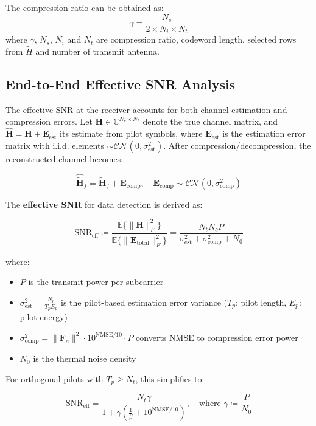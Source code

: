 \documentclass[lettersize,journal]{IEEEtran}
\begin{document}
The compression ratio can be obtained as:
\[
\gamma = \frac{N_{s}}{2\times N_{i}\times N_{t}}  
\]
where $\gamma$, $N_{s}$, $N_{i}$ and $N_{t}$ are compression ratio, codeword length, selected rows from $\tilde{H}$ and number of transmit antenna.

\subsection{End-to-End Effective SNR Analysis}
The effective SNR at the receiver accounts for both channel estimation and compression errors. Let $\mathbf{H} \in \mathbb{C}^{N_c \times N_t}$ denote the true channel matrix, and $\hat{\mathbf{H}} = \mathbf{H} + \mathbf{E}_{\text{est}}$ its estimate from pilot symbols, where $\mathbf{E}_{\text{est}}$ is the estimation error matrix with i.i.d. elements $\sim \mathcal{CN}(0,\sigma_{\text{est}}^2)$. After compression/decompression, the reconstructed channel becomes:

\begin{equation}
\hat{\tilde{\mathbf{H}}}_f = \tilde{\mathbf{H}}_f + \mathbf{E}_{\text{comp}}, \quad \mathbf{E}_{\text{comp}} \sim \mathcal{CN}(0,\sigma_{\text{comp}}^2)
\end{equation}

The \textbf{effective SNR} for data detection is derived as:

\begin{equation}
\text{SNR}_{\text{eff}} \coloneqq \frac{\mathbb{E}\{\|\mathbf{H}\|_F^2\}}{\mathbb{E}\{\|\mathbf{E}_{\text{total}}\|_F^2\}} = \frac{N_t N_c P}{\sigma_{\text{est}}^2 + \sigma_{\text{comp}}^2 + N_0}
\end{equation}

\noindent where:
\begin{itemize}
\item $P$ is the transmit power per subcarrier
\item $\sigma_{\text{est}}^2 = \frac{N_0}{T_p E_p}$ is the pilot-based estimation error variance ($T_p$: pilot length, $E_p$: pilot energy)
\item $\sigma_{\text{comp}}^2 = \|\mathbf{F}_a\|^2 \cdot 10^{\text{NMSE}/10} \cdot P$ converts NMSE to compression error power
\item $N_0$ is the thermal noise density
\end{itemize}

For orthogonal pilots with $T_p \geq N_t$, this simplifies to:

\begin{equation}
\text{SNR}_{\text{eff}} = \frac{N_t \gamma}{1 + \gamma\left(\frac{1}{\beta} + 10^{\text{NMSE}/10}\right)}, \quad \text{where } \gamma \coloneqq \frac{P}{N_0}
\end{equation}
\end{document}
